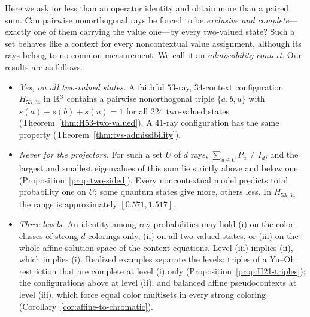 \documentclass[aps,pra,reprint,superscriptaddress,longbibliography,nofootinbib,floatfix,10pt]{revtex4-2}
\theoremstyle{definition}\newtheorem{definition}[theorem]{Definition}
\theoremstyle{remark}\newtheorem{remark}[theorem]{Remark}
\begin{document}
Here we ask for less than an operator identity and obtain more than a paired sum. Can pairwise nonorthogonal rays be forced to be \emph{exclusive and complete}---exactly one of them carrying the value one---by every two-valued state? Such a set behaves like a context for every noncontextual value assignment, although its rays belong to no common measurement. We call it an \emph{admissibility context}. Our results are as follows.
\begin{itemize}
\item \emph{Yes, on all two-valued states.} A faithful $53$-ray, $34$-context configuration $H_{53,34}$ in $\mathbb R^3$ contains a pairwise nonorthogonal triple $\{a,b,u\}$ with $s(a)+s(b)+s(u)=1$ for all $224$ two-valued states (Theorem~\ref{thm:H53-two-valued}). A $41$-ray configuration has the same property (Theorem~\ref{thm:tvs-admissibility}).
\item \emph{Never for the projectors.} For such a set $U$ of $d$ rays, $\sum_{u\in U}P_u\neq I_d$, and the largest and smallest eigenvalues of this sum lie strictly above and below one (Proposition~\ref{prop:two-sided}). Every noncontextual model predicts total probability one on $U$; some quantum states give more, others less. In $H_{53,34}$ the range is approximately $[0.571,1.517]$.
\item \emph{Three levels.} An identity among ray probabilities may hold (i) on the color classes of strong $d$-colorings only, (ii) on all two-valued states, or (iii) on the whole affine solution space of the context equations. Level (iii) implies (ii), which implies (i). Realized examples separate the levels: triples of a Yu--Oh restriction that are complete at level (i) only (Proposition~\ref{prop:H21-triples}); the configurations above at level (ii); and balanced affine pseudocontexts at level (iii), which force equal color multisets in every strong coloring (Corollary~\ref{cor:affine-to-chromatic}).
\end{itemize}
\end{document}
